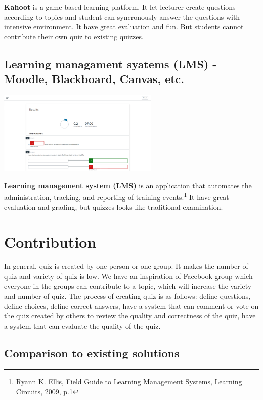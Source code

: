 \documentclass[ 10pt]{report}
\begin{document}
    \textbf{Kahoot} is a game-based learning platform. It let lecturer create questions according to topics and student can syncronously answer the questions with intensive environment. It have great evaluation and fun. But students cannot contribute their own quiz to existing quizzes.

    \subsection{Learning managament syatems (LMS) - Moodle, Blackboard, Canvas, etc.}
    \begin{center}
        \includegraphics[height=150px]{LMS.png}
    \end{center}

    \textbf{Learning management system (LMS)} is an application that automates the administration, tracking, and reporting of training events.\footnote{Ryann K. Ellis, Field Guide to Learning Management Systems, Learning Circuits, 2009, p.1} It have great evaluation and grading, but quizzes looks like traditional examination.

    \pagebreak
    \section{Contribution}

    In general, quiz is created by one person or one group. It makes the number of quiz and variety of quiz is low. We have an inspiration of Facebook group which everyone in the groups can contribute to a topic, which will increase the variety and number of quiz. The process of creating quiz is as follows: define questions, define choices, define correct answers, have a system that can comment or vote on the quiz created by others to review the quality and correctness of the quiz, have a system that can evaluate the quality of the quiz.

    \subsection{Comparison to existing solutions}
    
\end{document}
